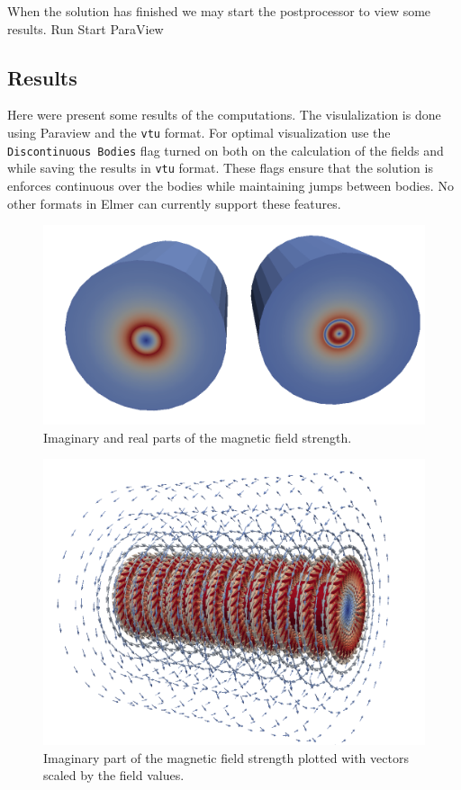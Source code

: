 When the solution has finished we may start the postprocessor to view some results.
\ttbegin
Run
  Start ParaView
\ttend


\subsection*{Results}

Here were present some results of the computations. The visulalization is done using Paraview and the \texttt{vtu} format.
For optimal visualization use the \texttt{Discontinuous Bodies} flag turned on both on the calculation of the fields
and while saving the results in \texttt{vtu} format. 
These flags ensure that the solution is enforces continuous over the
bodies while maintaining jumps between bodies. 
No other formats in Elmer can currently support these features.

\begin{figure}[h]
\centering
\includegraphics[width=120 mm]{WireBfieldReIm}
\caption{Imaginary and real parts of the magnetic field strength.}\label{fg:BfieldWire}
\end{figure}  

\begin{figure}[h]
\centering
\includegraphics[width=120 mm]{WireBfieldImVectors}
\caption{Imaginary part of the magnetic field strength plotted with vectors scaled by the field values.}
\label{fg:BfieldWireVectors}
\end{figure}  


